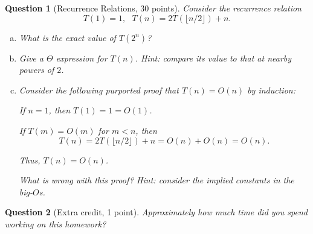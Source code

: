 \documentclass{article}
\newtheorem{ques}{Question}
\begin{document}
\begin{ques}[Recurrence Relations, 30 points]
Consider the recurrence relation
$$
T(1) = 1, \ \ \ T(n) = 2T(\lfloor n/2\rfloor) + n.
$$
\begin{enumerate}[(a)]
\item What is the exact value of $T(2^n)$?
\item Give a $\Theta$ expression for $T(n)$. Hint: compare its value to that at nearby powers of $2$.
\item Consider the following purported proof that $T(n)=O(n)$ by induction:

\noindent If $n=1$, then $T(1)=1=O(1)$.

\noindent If $T(m)=O(m)$ for $m < n$, then
$$
T(n) =2T(\lfloor n/2\rfloor) + n = O(n) + O(n) = O(n).
$$

\noindent Thus, $T(n)=O(n)$.

\smallskip \noindent What is wrong with this proof? Hint: consider the implied constants in the big-$O$s.
\end{enumerate}
\end{ques}

\begin{ques}[Extra credit, 1 point]
Approximately how much time did you spend working on this homework?
\end{ques}
\end{document}
